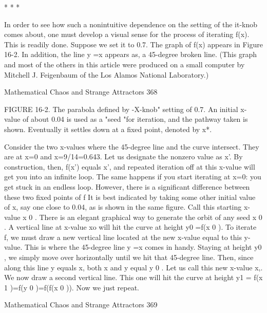                                           *    *   *

              In order to see how such a nonintuitive dependence on the setting of
      the it-knob comes about, one must develop a visual sense for the process of
      iterating f(x). This is readily done. Suppose we set it to 0.7. The graph of f(x)
      appears in Figure 16-2. In addition, the line y =x appears as, a 45-degree
      broken line. (This graph and most of the others in this article were produced
      on a small computer by Mitchell J. Feigenbaum of the Los Alamos National
      Laboratory.)




Mathematical Chaos and Strange Attractors                                            368

      FIGURE 16-2. The parabola defined by -X-knob" setting of 0.7. An initial x-
      value of about 0.04 is used as a "seed "for iteration, and the pathway taken is
      shown. Eventually it settles down at a fixed point, denoted by x*.

              Consider the two x-values where the 45-degree line and the curve
      intersect. They are at x=0 and x=9/14=0.643. Let us designate the nonzero
      value as x'. By construction, then, f(x') equals x', and repeated iteration off at
      this x-value will get you into an infinite loop. The same happens if you start
      iterating at x=0: you get stuck in an endless loop. However, there is a
      significant difference between these two fixed points of f It is best indicated by
      taking some other initial value of x, say one close to 0.04, as is shown in the
      same figure. Call this starting x-value x 0 . There is an elegant graphical way to
      generate the orbit of any seed x 0 . A vertical line at x-value xo will hit the
      curve at height y0 =f(x 0 ). To iterate f, we must draw a new vertical line located
      at the new x-value equal to this y-value. This is where the 45-degree line y =x
      comes in handy. Staying at height y0 , we simply move over horizontally until
      we hit that 45-degree line. Then, since along this line y equals x, both x and y
      equal y 0 . Let us call this new x-value x,. We now draw a second vertical line.
      This one will hit the curve at height y1 = f(x 1 )=f(y 0 )=f(f(x 0 )). Now we just
      repeat.




Mathematical Chaos and Strange Attractors                                            369

